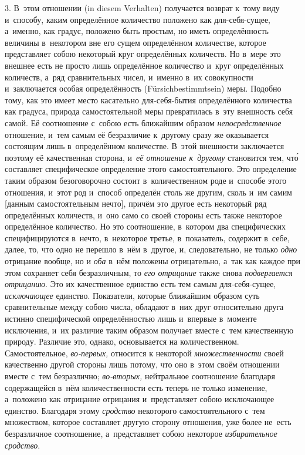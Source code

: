 3. В~этом отношении (in die\-sem Ver\-hal\-ten) получается возврат к~тому виду
и~способу, каким определённое количество положено как для-себя-сущее, а~именно,
как градус, положено быть простым, но иметь определённость величины в~некотором
вне его сущем определённом количестве, которое представляет собою некоторый
круг определённых количеств. Но в~мере это внешнее есть не просто лишь
определённое количество и~круг определённых количеств, а~ряд сравнительных
чисел, и~именно в~их совокупности и~заключается особая определённость
(Für\-sich\-bes\-timmt\-sein) меры. Подобно тому, как это имеет место
касательно для-себя-бытия определённого количества как градуса, природа
самостоятельной меры превратилась в~эту внешность себя самой. Её соотношение
с~собою есть ближайшим образом {\em непосредственное} отношение, и~тем самым её
безразличие к~другому сразу же оказывается состоящим лишь в~определённом
количестве. В~этой внешности заключается поэтому её качественная сторона,
и~{\em её отношение к~другому} становится тем, чт\'{о} составляет специфическое
определение этого самостоятельного. Это определение таким образом безоговорочно
состоит в~количественном роде и~способе этого отношения, и~этот род и~способ
определён столь же другим, сколь и~им самим [данным самостоятельным нечто],
причём это другое есть некоторый ряд определённых количеств, и~оно само со
своей стороны есть также некоторое определённое количество. Но это соотношение,
в~котором два специфических специфицируются в~нечто, в~некоторое третье,
в~показатель, содержит в~себе, далее, то, что одно не перешло в~нём в~другое,
и, следовательно, не только {\em одно} отрицание вообще, но и {\em оба} в~нём
положены отрицательно, а~так как каждое при этом сохраняет себя безразличным,
то {\em его отрицание} также снова {\em подвергается отрицанию}. Это их
качественное единство есть тем самым для-себя-сущее, {\em исключающее}
единство. Показатели, которые ближайшим образом суть сравнительные между собою
числа, обладают в~них друг относительно друга истинно специфической
определённостью лишь и~впервые в~моменте исключения, и~их различие таким
образом получает вместе с~тем качественную природу. Различие это, однако,
основывается на количественном. Самостоятельное, {\em во-первых,} относится к
некоторой {\em множественности} своей качественно другой стороны лишь потому,
что оно в~этом своём отношении вместе с~тем безразлично; {\em во-вторых,}
нейтральное соотношение благодаря содержащейся в~нём количественности есть
теперь не только изменение, а~положено как отрицание отрицания и~представляет
собою исключающее единство. Благодаря этому {\em сродство} некоторого
самостоятельного с~тем множеством, которое составляет другую сторону отношения,
уже более не~есть безразличное соотношение, а~представляет собою некоторое
{\em избирательное сродство}.

